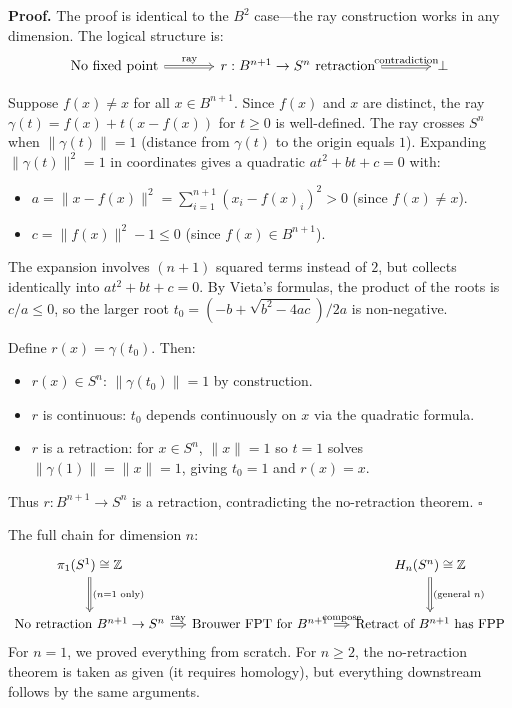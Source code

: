 \documentclass[11pt]{report}
\renewenvironment{proof}[1][Proof]{\noindent\textbf{#1.} }{\hfill$\square$\par\vspace{5pt}}
\begin{document}
\begin{proof}
The proof is identical to the $B^2$ case---the ray construction works in any dimension. The logical structure is:
\[
\begin{tikzcd}[column sep=large]
\text{No fixed point} \arrow[r, Rightarrow, "\text{ray}"] & r: B^{n+1} \to S^n \text{ retraction} \arrow[r, Rightarrow, "\text{contradiction}"] & \bot
\end{tikzcd}
\]

Suppose $f(x) \neq x$ for all $x \in B^{n+1}$. Since $f(x)$ and $x$ are distinct, the ray $\gamma(t) = f(x) + t(x - f(x))$ for $t \geq 0$ is well-defined. The ray crosses $S^n$ when $\|\gamma(t)\| = 1$ (distance from $\gamma(t)$ to the origin equals $1$). Expanding $\|\gamma(t)\|^2 = 1$ in coordinates gives a quadratic $at^2 + bt + c = 0$ with:
\begin{itemize}[nosep]
    \item $a = \|x - f(x)\|^2 = \sum_{i=1}^{n+1} (x_i - f(x)_i)^2 > 0$ (since $f(x) \neq x$).
    \item $c = \|f(x)\|^2 - 1 \leq 0$ (since $f(x) \in B^{n+1}$).
\end{itemize}
The expansion involves $(n+1)$ squared terms instead of $2$, but collects identically into $at^2 + bt + c = 0$. By Vieta's formulas, the product of the roots is $c/a \leq 0$, so the larger root $t_0 = (-b + \sqrt{b^2 - 4ac})/2a$ is non-negative.

Define $r(x) = \gamma(t_0)$. Then:
\begin{itemize}[nosep]
    \item $r(x) \in S^n$: $\|\gamma(t_0)\| = 1$ by construction.
    \item $r$ is continuous: $t_0$ depends continuously on $x$ via the quadratic formula.
    \item $r$ is a retraction: for $x \in S^n$, $\|x\| = 1$ so $t = 1$ solves $\|\gamma(1)\| = \|x\| = 1$, giving $t_0 = 1$ and $r(x) = x$.
\end{itemize}
Thus $r: B^{n+1} \to S^n$ is a retraction, contradicting the no-retraction theorem.
\end{proof}

\begin{rembox}
The full chain for dimension $n$:
\[
\begin{tikzcd}[column sep=small, row sep=large]
\pi_1(S^1) \cong \mathbb{Z} \arrow[d, Rightarrow, "\text{(}n=1\text{ only)}"] & & H_n(S^n) \cong \mathbb{Z} \arrow[d, Rightarrow, "\text{(general }n\text{)}"] \\
\text{No retraction } B^{n+1} \to S^n \arrow[r, Rightarrow, "\text{ray}"] & \text{Brouwer FPT for } B^{n+1} \arrow[r, Rightarrow, "\text{compose}"] & \text{Retract of } B^{n+1} \text{ has FPP}
\end{tikzcd}
\]
For $n = 1$, we proved everything from scratch. For $n \geq 2$, the no-retraction theorem is taken as given (it requires homology), but everything downstream follows by the same arguments.
\end{rembox}
\end{document}
